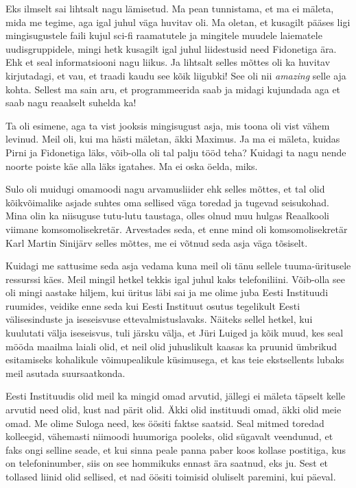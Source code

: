 Eks ilmselt sai lihtsalt nagu lämisetud. Ma pean tunnistama, et ma ei mäleta, 
mida me  tegime, aga igal juhul väga huvitav oli. Ma oletan, et kusagilt  
pääses ligi mingisugustele faili kujul sci-fi  raamatutele ja mingitele muudele 
laiematele uudisgruppidele, mingi hetk  kusagilt igal juhul liidestusid need 
Fidonetiga ära. Ehk et seal informatsiooni nagu liikus. Ja lihtsalt selles 
mõttes oli ka huvitav kirjutadagi, et vau, et traadi kaudu see kõik liigubki! 
See oli nii \emph{amazing} selle aja kohta. Sellest ma sain aru, et 
programmeerida saab ja midagi kujundada aga et saab nagu  reaalselt suhelda ka!


Ta oli esimene, aga ta vist jooksis mingisugust asja, mis toona oli vist vähem 
levinud. Meil oli, kui ma hästi mäletan, äkki  Maximus. Ja ma ei mäleta, kuidas 
Pirni ja Fidonetiga läks, võib-olla oli tal palju tööd teha? Kuidagi ta nagu 
nende noorte poiste käe alla läks igatahes. Ma ei oska öelda, miks.

Sulo oli muidugi omamoodi nagu arvamusliider ehk selles mõttes, et tal olid  
kõikvõimalike asjade suhtes oma sellised väga toredad ja tugevad seisukohad. 
Mina olin ka niisuguse tutu-lutu taustaga, olles olnud muu hulgas 
Reaalkooli viimane komsomolisekretär.
Arvestades seda, et enne mind oli komsomolisekretär Karl Martin 
Sinijärv selles mõttes, me  ei võtnud seda 
asja väga tõsiselt.

Kuidagi me sattusime seda asja vedama  kuna meil oli tänu sellele 
tuuma-üritusele ressurssi käes. Meil mingil hetkel tekkis igal juhul  kaks 
telefoniliini. Võib-olla see oli mingi aastake hiljem, kui  üritus läbi sai ja 
me olime juba Eesti Instituudi ruumides, veidike enne 
seda kui Eesti Instituut osutus tegelikult Eesti välisesinduste ja iseseisvuse 
ettevalmistuslavaks. Näiteks sellel hetkel, kui kuulutati välja iseseisvus, 
tuli järsku välja, et Jüri Luiged ja kõik muud, kes seal 
mööda maailma laiali olid, et neil olid juhuslikult kaasas ka pruunid ümbrikud 
esitamiseks kohalikule võimupealikule küsimusega, et kas teie ekstsellents 
lubaks meil asutada suursaatkonda. 

Eesti Instituudis olid meil ka mingid omad arvutid, jällegi ei mäleta täpselt 
kelle arvutid need olid, kust nad pärit olid. Äkki olid instituudi omad, äkki 
olid meie omad. Me olime Suloga need, kes öösiti  
faktse saatsid. Seal mitmed toredad kolleegid, vähemasti niimoodi huumoriga 
pooleks, olid sügavalt veendunud, et faks ongi selline  seade, et kui sinna  
peale panna paber koos kollase postitiga, kus on telefoninumber, siis on see 
hommikuks ennast ära saatnud, eks ju. Sest et tollased liinid olid sellised, et 
nad öösiti toimisid oluliselt paremini, kui päeval. 

